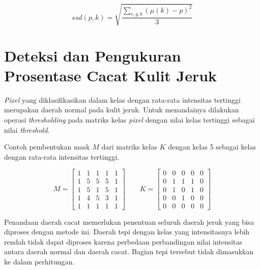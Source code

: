 \documentclass[laporan.tex]{subfiles}
\begin{document}
\begin{equation}
ssd(p,k) = \sqrt{\frac{\sum_{r,g,b} (\mu(k) - p)^2}{3}}
\end{equation}

\section{Deteksi dan Pengukuran Prosentase Cacat Kulit Jeruk}


\emph{Pixel} yang diklasifikasikan dalam kelas dengan rata-rata intensitas tertinggi merupakan daerah normal pada kulit jeruk. Untuk menandainya dilakukan operasi \emph{thresholding} pada matriks kelas \emph{pixel} dengan nilai kelas tertinggi sebagai nilai \emph{threshold}.

Contoh pembentukan mask $M$ dari matriks kelas $K$ dengan kelas 5 sebagai kelas dengan rata-rata intensitas tertinggi.

\begin{equation*}
M  = \begin{bmatrix}
1 & 1 & 1 & 1 & 1 \\
1 & 5 & 5 & 5 & 1 \\
1 & 5 & 1 & 5 & 1 \\
1 & 4 & 5 & 3 & 1 \\
1 & 1 & 1 & 1 & 1
\end{bmatrix} \qquad 
K  = \begin{bmatrix}
0 & 0 & 0 & 0 & 0 \\
0 & 1 & 1 & 1 & 0 \\
0 & 1 & 0 & 1 & 0 \\
0 & 0 & 1 & 0 & 0 \\
0 & 0 & 0 & 0 & 0
\end{bmatrix}
\end{equation*}


Penandaan daerah cacat memerlukan penentuan seluruh daerah jeruk yang bisa diproses dengan metode ini. Daerah tepi dengan kelas yang intensitasnya lebih rendah tidak dapat diproses karena perbedaan perbandingan nilai intensitas antara daerah normal dan daerah cacat. Bagian tepi tersebut tidak dimasukkan ke dalam perhitungan.
\end{document}
